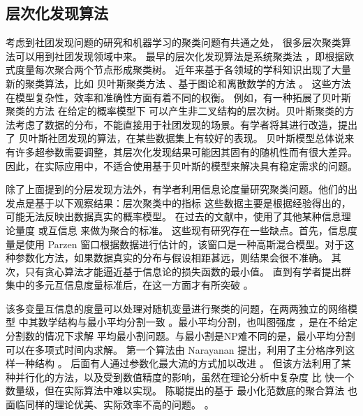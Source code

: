 \subsection{层次化发现算法}
考虑到社团发现问题的研究和机器学习的聚类问题有共通之处，
很多层次聚类算法可以用到社团发现领域中来。
最早的层次化发现算法是系统聚类法 \cite{slink}，即根据欧式度量每次聚合两个节点形成聚类树。
近年来基于各领域的学科知识出现了大量新的聚类算法，比如
贝叶斯聚类方法 \cite{bhc}、基于图论和离散数学的方法 \cite{dasgupta2016cost}。
这些方法在模型复杂性，效率和准确性方面有着不同的权衡。
例如，有一种拓展了贝叶斯聚类的方法 \cite{blundell2011discovering}
在给定的概率模型下
可以产生非二叉结构的层次树。贝叶斯聚类的方法考虑了数据的分布，不能直接用于社团发现的场景。有学者将其进行改造，提出了
贝叶斯社团发现的算法\cite{RN23}，在某些数据集上有较好的表现。
贝叶斯模型总体说来有许多超参数需要调整，其层次化发现结果可能因其固有的随机性而有很大差异。 因此，在实际应用中，不适合使用基于贝叶斯的模型来解决具有稳定需求的问题。 

除了上面提到的分层发现方法外，有学者利用信息论度量研究聚类问题。他们的出发点是基于以下观察结果：层次聚类中的指标
这些数据主要是根据经验得出的，可能无法反映出数据真实的概率模型。
在过去的文献中，使用了其他某种信息理论量度 \cite{ic2002} 或互信息\cite{mim}
来做为聚合的标准。
这些现有研究存在一些缺点。首先，信息度量是使用 Parzen 窗口根据数据进行估计的，该窗口是一种高斯混合模型。对于这种参数化方法，如果数据真实的分布与假设相距甚远，则结果会很不准确。
其次，只有贪心算法才能逼近基于信息论的损失函数的最小值。 
直到有学者提出群集中的多元互信息度量标准后，在这一方面才有所突破 \cite{ic2016}。 

该多变量互信息的度量可以处理对随机变量进行聚类的问题，在两两独立的网络模型 \cite{pin}
中其数学结构与最小平均分割一致  \cite{mac}。最小平均分割，也叫图强度 \cite{cunningham1985optimal}，是在不给定分割数的情况下求解
平均最小割问题。与最小割是NP难不同的是，最小平均分割可以在多项式时间内求解。
第一个算法由 Narayanan 提出，利用了主分格序列这样一种结构 \cite{narayanan}。
后面有人通过参数化最大流的方式加以改进 \cite{pic}。
但该方法利用了某种并行化的方法，以及受到数值精度的影响，虽然在理论分析中复杂度
比 \cite{narayanan} 快一个数量级，但在实际算法中难以实现。
陈聪提出的基于 最小化范数底的聚合算法 也面临同样的理论优美、实际效率不高的问题。 \cite{chan2020agglomerative}。

